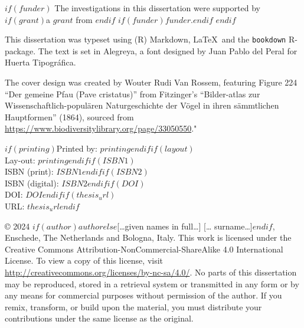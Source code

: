 \documentclass[$if(fontsize)$$fontsize$,$endif$$if(papersize)$$papersize$paper,twoside,$endif$$for(classoption)$$classoption$$sep$,$endfor$]{$documentclass$} %
\begin{document}
\vspace*{\fill}
\begingroup %
\small
\setlength{\parskip}{\baselineskip} %
\setlength\parindent{0pt} %
$if(funder)$
The investigations in this dissertation were supported by $if(grant)$a $grant$ from $endif$
$if(funder)$$funder$.$endif$
$endif$

This dissertation was typeset using (R) Markdown, \LaTeX\ and the \verb+bookdown+ R-package. The text is set in Alegreya, a font designed by Juan Pablo del Peral for Huerta Tipográfica.

The cover design was created by Wouter Rudi Van Rossem, featuring Figure 224 “Der gemeine Pfau (Pave cristatus)” from Fitzinger’s “Bilder-atlas zur Wissenschaftlich-populären Naturgeschichte der Vögel in ihren sämmtlichen Hauptformen” (1864), sourced from \url{https://www.biodiversitylibrary.org/page/33050550}."

$if(printing)$Printed by: $printing$$endif$$if(layout)$\\ Lay-out: $printing$$endif$$if(ISBN1)$\\ ISBN (print): $ISBN1$$endif$$if(ISBN2)$\\ ISBN (digital): $ISBN2$$endif$$if(DOI)$\\ DOI: $DOI$$endif$$if(thesis_url)$\\ URL: $thesis_url$$endif$


© 2024 $if(author)$$author$$else$[…given names in full…] [… surname…]$endif$, Enschede, The Netherlands and Bologna, Italy. This work is licensed under the Creative Commons Attribution-NonCommercial-ShareAlike 4.0 International License. To view a copy of this license, visit \url{http://creativecommons.org/licenses/by-nc-sa/4.0/}. No parts of this dissertation may be reproduced, stored in a retrieval system or transmitted in any form or by any means for commercial purposes without permission of the author. If you remix, transform, or build upon the material, you must distribute your contributions under the same license as the original.
\endgroup


\clearpage
\thispagestyle{empty}
\noindent
\end{document}
